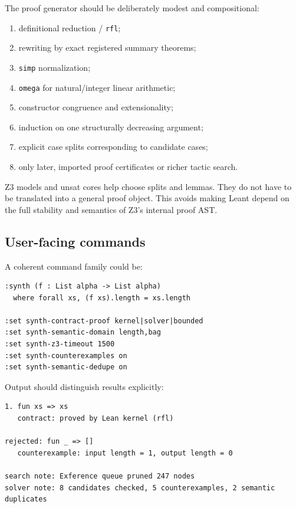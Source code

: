 \documentclass[11pt,oneside]{article}
\newcommand{\code}[1]{\texttt{#1}}
\begin{document}
The proof generator should be deliberately modest and compositional:

\begin{enumerate}
  \item definitional reduction / \code{rfl};
  \item rewriting by exact registered summary theorems;
  \item \code{simp} normalization;
  \item \code{omega} for natural/integer linear arithmetic;
  \item constructor congruence and extensionality;
  \item induction on one structurally decreasing argument;
  \item explicit case splits corresponding to candidate cases;
  \item only later, imported proof certificates or richer tactic search.
\end{enumerate}

Z3 models and unsat cores help choose splits and lemmas. They do not have to be
translated into a general proof object. This avoids making Leant depend on the full
stability and semantics of Z3's internal proof AST.

\subsection{User-facing commands}

A coherent command family could be:

\begin{lstlisting}[language=Lean]
:synth (f : List alpha -> List alpha)
  where forall xs, (f xs).length = xs.length

:set synth-contract-proof kernel|solver|bounded
:set synth-semantic-domain length,bag
:set synth-z3-timeout 1500
:set synth-counterexamples on
:set synth-semantic-dedupe on
\end{lstlisting}

Output should distinguish results explicitly:

\begin{lstlisting}
1. fun xs => xs
   contract: proved by Lean kernel (rfl)

rejected: fun _ => []
   counterexample: input length = 1, output length = 0

search note: Exference queue pruned 247 nodes
solver note: 8 candidates checked, 5 counterexamples, 2 semantic duplicates
\end{lstlisting}
\end{document}
